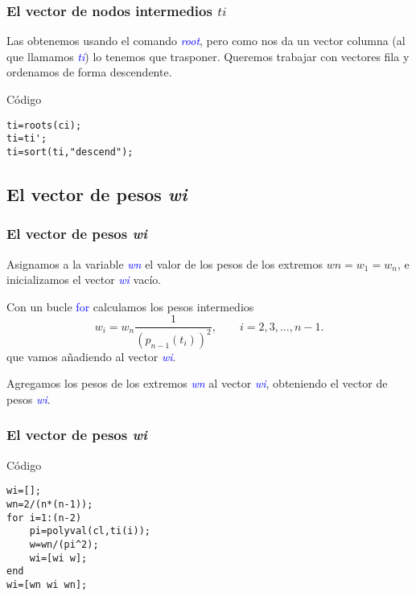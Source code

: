 \documentclass{beamer}
\begin{document}
\begin{frame}[fragile]
\frametitle{El vector de nodos intermedios $ti$}
\textbf{}

Las obtenemos usando el comando \textcolor{blue}{\textit{root}}, pero como nos da un vector columna (al que llamamos \textcolor{blue}{\textit{ti}}) lo tenemos que trasponer. Queremos trabajar con vectores fila y ordenamos de forma descendente.

\begin{exampleblock}{Código}
\begin{verbatim}
ti=roots(ci);
ti=ti';
ti=sort(ti,"descend");
\end{verbatim}
\end{exampleblock}
\end{frame}


\subsection{El vector de pesos \textit{wi}}
\begin{frame}
\frametitle{El vector de pesos \textit{wi}}
Asignamos a la variable \textcolor{blue}{\textit{wn}} el valor de los pesos de los extremos $wn=w_1=w_n$, e inicializamos el vector \textcolor{blue}{\textit{wi}} vacío.

Con un bucle \textcolor{blue}{for} calculamos los pesos intermedios 
\[
w_i=w_n\frac{1}{(p_{n-1}(t_i))^2},\qquad i=2,3,...,n-1.
\]
que vamos añadiendo al vector \textcolor{blue}{\textit{wi}}.

Agregamos los pesos de los extremos \textcolor{blue}{\textit{wn}} al vector \textcolor{blue}{\textit{wi}}, obteniendo el vector de pesos \textcolor{blue}{\textit{wi}}.
\end{frame}


\begin{frame}[fragile]
\frametitle{El vector de pesos \textit{wi}}
\begin{exampleblock}{Código}
\begin{verbatim}
wi=[];
wn=2/(n*(n-1));
for i=1:(n-2)
    pi=polyval(cl,ti(i));
    w=wn/(pi^2);
    wi=[wi w];
end
wi=[wn wi wn];
\end{verbatim}
\end{exampleblock}
\end{frame}
\end{document}
